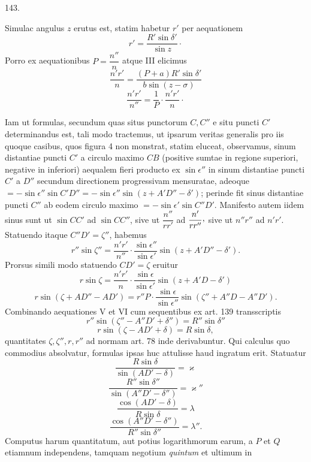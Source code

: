 \par{}\medskip
\begin{center}\hypertarget{native-192-article143}{}143.\end{center}
Simulac angulus $z$ erutus est, statim habetur $r'$ per aequationem
\[
r'=\frac{R'\sin\delta'}{\sin z}\mathpunct{\cdot}
\]
Porro ex aequationibus $P=\dfrac{n''}{n}$ atque III elicimus
\[
\frac{n'r'}{n}=\frac{(P+a)R'\sin\delta'}{b\sin(z-\sigma)}
\]
\[
\frac{n'r'}{n''}=\frac{1}{P}\cdot\frac{n'r'}{n}\mathpunct{\cdot}
\]

Iam ut formulas, secundum quas situs punctorum $C,C''$ e situ puncti $C'$
determinandus est, tali modo tractemus, ut ipsarum veritas generalis pro iis
quoque casibus, quos figura 4 non monstrat, statim eluceat, observamus, sinum
distantiae puncti $C'$ a circulo maximo $CB$ (positive sumtae in regione
superiori, negative in inferiori) aequalem fieri producto ex $\sin\epsilon''$
in sinum distantiae puncti $C'$ a $D''$ secundum directionem progressivam
mensuratae, adeoque $=-\sin\epsilon''\sin C'D''=-\sin\epsilon''\sin(z+A'D''-\delta')$;
perinde fit sinus distantiae puncti $C''$ ab eodem circulo maximo
$=-\sin\epsilon'\sin C''D'$. Manifesto autem iidem sinus sunt ut $\sin CC'$ ad
$\sin CC''$, sive ut $\dfrac{n''}{rr'}$ ad $\dfrac{n'}{rr''}\mathpunct{\raisebox{.45ex}{,}}$ sive ut $n''r''$ ad
$n'r'$. Statuendo itaque $C''D'=\zeta''$, habemus
\[
\tag*{V.}r''\sin\zeta''=\frac{n'r'}{n''}\cdot\frac{\sin\epsilon''}{\sin\epsilon'}\sin(z+A'D''-\delta').
\]
Prorsus simili modo statuendo $CD'=\zeta$ eruitur
\[
\tag*{VI.}r\sin\zeta=\frac{n'r'}{n}\cdot\frac{\sin\epsilon}{\sin\epsilon'}\sin(z+A'D-\delta')
\]
\[
\tag*{VII.}r\sin(\zeta+AD''-AD')=r''P\cdot\frac{\sin\epsilon}{\sin\epsilon''}\sin(\zeta''+A''D-A''D').
\]
Combinando aequationes V et VI cum sequentibus ex art. 139 transscriptis
\[
\tag*{VIII.}r''\sin(\zeta''-A''D'+\delta'')=R''\sin\delta''
\]
\[
\tag*{IX.}r\sin(\zeta-AD'+\delta)=R\sin\delta,
\]
quantitates $\zeta,\zeta'',r,r''$ ad normam art. 78 inde derivabuntur.
Qui calculus quo commodius absolvatur, formulas ipsas huc attulisse haud
ingratum erit. Statuatur
\[
\tag*{17)}\frac{R\sin\delta}{\sin(AD'-\delta)}=\varkappa
\]
\[
\tag*{18)}\frac{R''\sin\delta''}{\sin(A''D'-\delta'')}=\varkappa''
\]
\[
\tag*{19)}\frac{\cos(AD'-\delta)}{R\sin\delta}=\lambda
\]
\[
\tag*{20)}\frac{\cos(A''D'-\delta'')}{R''\sin\delta''}=\lambda''.
\]
Computus harum quantitatum, aut potius logarithmorum earum, a $P$ et $Q$
etiamnum independens, tamquam negotium \emph{quintum} et ultimum in
